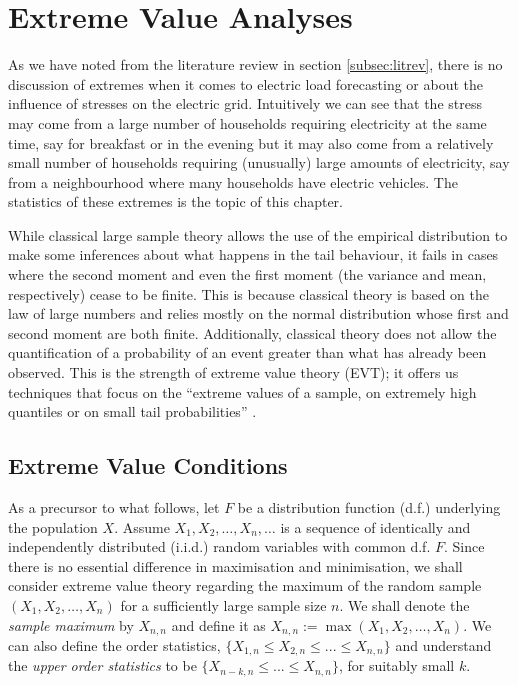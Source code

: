 
\chapter{Extreme Value Analyses} \label{sec:EVT}

As we have noted from the literature review in section \ref{subsec:litrev}, there is no discussion of extremes when it comes to electric load forecasting or about the influence of stresses on the electric grid. Intuitively we can see that the stress may come from a large number of households requiring electricity at the same time, say for breakfast or in the evening but it may also come from a relatively small number of households requiring (unusually) large amounts of electricity, say from a neighbourhood where many households have electric vehicles. The statistics of these extremes is the topic of this chapter.

While classical large sample theory allows the use of the empirical distribution to make some inferences about what happens in the tail behaviour, it fails in cases where the second moment and even the first moment (the variance and mean, respectively) cease to be finite. This is because classical theory is based on the law of large numbers and relies mostly on the normal distribution whose first and second moment are both finite. Additionally, classical theory does not allow the quantification of a probability of an event greater than what has already been observed. This is the strength of extreme value theory (EVT); it offers us techniques that focus on the ``extreme values of a sample, on extremely high quantiles or on small tail probabilities'' \cite[ch.~1]{beirlant}.

\section{Extreme Value Conditions} \label{subsec:EVT}

As a precursor to what follows, let $F$ be a distribution function (d.f.) underlying the population $X$. Assume $X_1,X_2, \ldots, X_n, \ldots$ is a sequence of identically and independently distributed (i.i.d.) random variables with common d.f. $F$. Since there is no essential difference in maximisation and minimisation, we shall consider extreme value theory regarding the maximum of the random sample $(X_1,X_2, \ldots, X_n)$ for a sufficiently large sample size $n$. We shall denote the \textit{sample maximum} by $X_{n,n}$ and define it as $X_{n,n}:= \max(X_1,X_2, \ldots, X_n)$. We can also define the order statistics, $\{X_{1,n} \le X_{2,n} \le ... \le X_{n,n}\}$ and understand the \textit{upper order statistics} to  be $\{X_{n-k,n} \le ... \le X_{n,n}\}$, for suitably small $k$.%

